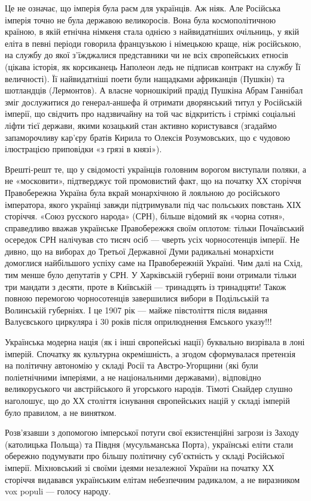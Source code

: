 Це не означає, що імперія була раєм для українців. Аж ніяк. Але Російська
імперія точно не була державою великоросів. Вона була космополітичною країною,
в якій етнічна німкеня стала однією з найвидатніших очільниць, у якій еліта в
певні періоди говорила французькою і німецькою краще, ніж російською, на службу
до якої з’їжджалися представники чи не всіх європейських етносів (цікава
історія, як корсиканець Наполеон ледь не підписав контракт на службу Її
величності). Її найвидатніші поети були нащадками африканців (Пушкін) та
шотландців (Лермонтов). А власне чорношкірий прадід Пушкіна Абрам Ганнібал зміг
дослужитися до генерал-аншефа й отримати дворянський титул у Російській
імперії, що свідчить про надзвичайну на той час відкритість і стрімкі соціальні
ліфти тієї держави, якими козацький стан активно користувався (згадаймо
запаморочливу кар’єру братів Кирила то Олексія Розумовських, що є чудовою
ілюстрацією приповідки «з грязі в князі»).

Врешті-решт те, що у свідомості українців головним ворогом виступали поляки, а
не «московити», підтверджує той промовистий факт, що на початку ХХ сторіччя
Правобережна Україна була вкрай монархічною й лояльною до російського
імператора, якого українці завжди підтримували під час польських повстань ХІХ
сторіччя. «Союз русского народа» (СРН), більше відомий як «чорна сотня»,
справедливо вважав українське Правобережжя своїм оплотом: тільки Почаївський
осередок СРН налічував сто тисяч осіб — чверть усіх чорносотенців імперії. Не
дивно, що на виборах до Третьої Державної Думи радикальні монархісти домоглися
найбільшого успіху саме на Правобережній Україні. Чим далі на Схід, тим менше
було депутатів у СРН. У Харківській губернії вони отримали тільки три мандати з
десяти, проте в Київській — тринадцять із тринадцяти! Також повною перемогою
чорносотенців завершилися вибори в Подільській та Волинській губерніях. І це
1907 рік — майже півстоліття після видання Валуєвського циркуляра і 30 років
після оприлюднення Емського указу!!!

Українська модерна нація (як і інші європейські нації) буквально визрівала в
лоні імперій. Спочатку як культурна окремішність, а згодом сформувалася
претензія на політичну автономію у складі Росії та Австро-Угорщини (які були
поліетнічними імперіями, а не національними державами), відповідно
великоруського чи австрійського й угорського народів. Тімоті Снайдер слушно
наголошує, що до ХХ століття існування європейських націй у складі імперій було
правилом, а не винятком. 

Розв’язавши з допомогою імперської потуги свої екзистенційні загрози із Заходу
(католицька Польща) та Півдня (мусульманська Порта), українські еліти стали
обережно подумувати про більшу політичну суб’єктність у складі Російської
імперії. Міхновський зі своїми ідеями незалежної України на початку ХХ сторіччя
видавався українським елітам небезпечним радикалом, а не виразником vox populi
— голосу народу.

